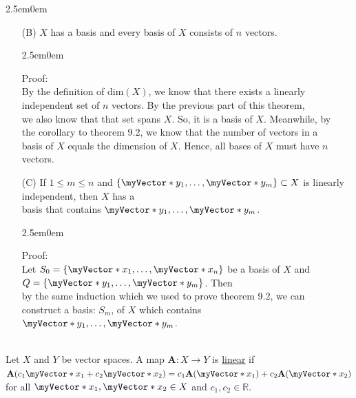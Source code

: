 \documentclass{book}
\newcommand{\hThree}{%
   \color{PineGreen!85!Orange}
   \fontsize{13}{15}\selectfont%
}
\newenvironment{myIndent}{%
   \begin{adjustwidth}{2.5em}{0em}%
}{%
   \end{adjustwidth}%
}
\newcommand{\udefine}[1]{{%
   \setulcolor{Red}%
   \setul{0.14em}{0.07em}%
   \ul{#1}%
}}
\newcommand{\myDim}[1]{\mathrm{dim}(#1)}
\newcommand{\mySepTwo}[1][.]{%
   {\noindent\color{#1}{\rule{6.5in}{0.5mm}}}\\%
}
\newcommand{\mVecAst}[1]{\myVector*{#1}}
\newcommand{\mMat}[1]{\mathbf{#1}}
\begin{document}
{\begin{myIndent}
\begin{itemize}
      \item[(B)] $X$ has a basis and every basis of $X$ consists of $n$ vectors.
      {\begin{myIndent}\hThree
         Proof:\\
         By the definition of $\myDim{X}$, we know that there exists a linearly\\ independent set of $n$ vectors. By the previous part of this theorem,\\ we also know that that set spans $X$. So, it is a basis of $X$. Meanwhile, by\\ the corollary to theorem 9.2, we know that the number of vectors in a\\ basis of $X$ equals the dimension of $X$. Hence, all bases of $X$ must have $n$ vectors.\\
      \end{myIndent}}

      \item[(C)] If $1 \leq m \leq n$ and $\{\mVecAst{y}_1, \ldots, \mVecAst{y}_m\} \subset X$ is linearly independent, then $X$ has a\\ basis that contains $\mVecAst{y}_1, \ldots, \mVecAst{y}_m$.
      {\begin{myIndent}\hThree
         Proof:\\
         Let $S_0 = \{\mVecAst{x}_1, \ldots, \mVecAst{x}_n\}$ be a basis of $X$ and $Q = \{\mVecAst{y}_1, \ldots, \mVecAst{y}_m\}$. Then\\ by the same induction which we used to prove theorem 9.2, we can\\ construct a basis:  $S_m$, of $X$ which contains $\mVecAst{y}_1, \ldots, \mVecAst{y}_m$.
      \end{myIndent}}
   \end{itemize}
\end{myIndent}}

\mySepTwo

Let $X$ and $Y$ be vector spaces. A map $\mMat{A}: X \longrightarrow Y$ is \udefine{linear} if\\ $\mMat{A}(c_1\mVecAst{x}_1 + c_2\mVecAst{x}_2) = c_1\mMat{A}(\mVecAst{x}_1) + c_2\mMat{A}(\mVecAst{x}_2)$ for all $\mVecAst{x}_1, \mVecAst{x}_2 \in X$ and $c_1, c_2 \in \mathbb{R}$.

\newpage
\end{document}
